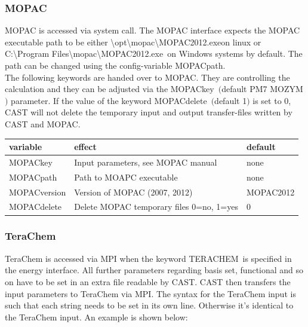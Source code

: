 \documentclass[10pt,a4paper]{article} %
\newif\ifdevmode %
\begin{document}
		\subsubsection{MOPAC}
		\ac{MOPAC} is accessed via system call. The \ac{MOPAC} interface expects the \ac{MOPAC} executable path to be either \glqq \textbackslash opt\textbackslash mopac\textbackslash MOPAC2012.exe\grqq on linux \ifdevmode ~\\ \colorbox{red}{ARE YOU SERIOUS? EXE ON LINUX? YES?} ~\\ \fi or \glqq C:\textbackslash Program Files\textbackslash mopac\textbackslash MOPAC2012.exe\grqq~on Windows systems by default. The path can be changed using the config-variable \glqq MOPACpath\grqq.~\\
		The following keywords are handed over to \ac{MOPAC}. They are controlling the calculation and they can be adjusted via the \glqq MOPACkey\grqq \ $($default \glqq PM7 MOZYM\grqq$)$ parameter. \ifdevmode ~\\ \colorbox{red}{IS THERE NO DEFAULT (TABLE) OR IS THERE ONE?} ~\\ \fi
		If the value of the keyword \glqq MOPACdelete\grqq \ $($default 1$)$ \ifdevmode ~\\ \colorbox{red}{IS DEFAULT 1 OR 0? COMPARE TABLE} ~\\ \fi is set to 0, \ac{CAST} will not delete the temporary input and output transfer-files written by \ac{CAST} and \ac{MOPAC}.

		\begin{tabularx}{\textwidth}{l|l|l}
			variable & effect & default \\
			\hline
			MOPACkey & Input parameters, see MOPAC manual & none\\
			MOPACpath & Path to MOAPC executable & none\\
			MOPACversion & Version of MOPAC (2007, 2012) & MOPAC2012\\
			MOPACdelete & Delete MOPAC temporary files 0=no, 1=yes & 0\\

		\end{tabularx}

		\subsubsection{TeraChem}
		TeraChem\supercite{terachem} is accessed via \ac{MPI}\supercite{mpi} when the keyword \glqq TERACHEM\grqq~is specified in the energy interface. All further parameters regarding basis set, functional and so on have to be set in an extra file readable by \ac{CAST}. \ac{CAST} then transfers the input parameters to TeraChem via \ac{MPI}. The syntax for the TeraChem input is such that each string needs to be set in its own line. Otherwise it’s identical to the TeraChem input. An example is shown below:
\end{document}
